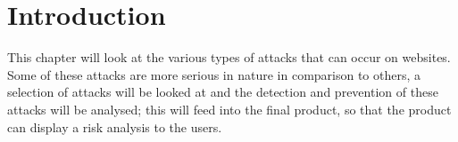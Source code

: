 
\section{Introduction}
This chapter will look at the various types of attacks that can occur on websites. Some of these attacks are more serious in nature in comparison to others, a selection of attacks will be looked at and the detection and prevention of these attacks will be analysed; this will feed into the final product, so that the product can display a risk analysis to the users. 
